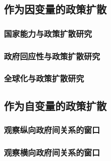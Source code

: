 \documentclass[
  12pt,
]{ctexart}
\begin{document}
\hypertarget{ux4f5cux4e3aux56e0ux53d8ux91cfux7684ux653fux7b56ux6269ux6563}{%
\subsection{作为因变量的政策扩散}\label{ux4f5cux4e3aux56e0ux53d8ux91cfux7684ux653fux7b56ux6269ux6563}}

\hypertarget{ux56fdux5bb6ux80fdux529bux4e0eux653fux7b56ux6269ux6563ux7814ux7a76}{%
\subsubsection{国家能力与政策扩散研究}\label{ux56fdux5bb6ux80fdux529bux4e0eux653fux7b56ux6269ux6563ux7814ux7a76}}

\hypertarget{ux653fux5e9cux56deux5e94ux6027ux4e0eux653fux7b56ux6269ux6563ux7814ux7a76}{%
\subsubsection{政府回应性与政策扩散研究}\label{ux653fux5e9cux56deux5e94ux6027ux4e0eux653fux7b56ux6269ux6563ux7814ux7a76}}

\hypertarget{ux5168ux7403ux5316ux4e0eux653fux7b56ux6269ux6563ux7814ux7a76}{%
\subsubsection{全球化与政策扩散研究}\label{ux5168ux7403ux5316ux4e0eux653fux7b56ux6269ux6563ux7814ux7a76}}

\hypertarget{ux4f5cux4e3aux81eaux53d8ux91cfux7684ux653fux7b56ux6269ux6563}{%
\subsection{作为自变量的政策扩散}\label{ux4f5cux4e3aux81eaux53d8ux91cfux7684ux653fux7b56ux6269ux6563}}

\hypertarget{ux89c2ux5bdfux7eb5ux5411ux653fux5e9cux95f4ux5173ux7cfbux7684ux7a97ux53e3}{%
\subsubsection{观察纵向政府间关系的窗口}\label{ux89c2ux5bdfux7eb5ux5411ux653fux5e9cux95f4ux5173ux7cfbux7684ux7a97ux53e3}}

\hypertarget{ux89c2ux5bdfux6a2aux5411ux653fux5e9cux95f4ux5173ux7cfbux7684ux7a97ux53e3}{%
\subsubsection{观察横向政府间关系的窗口}\label{ux89c2ux5bdfux6a2aux5411ux653fux5e9cux95f4ux5173ux7cfbux7684ux7a97ux53e3}}
\end{document}

